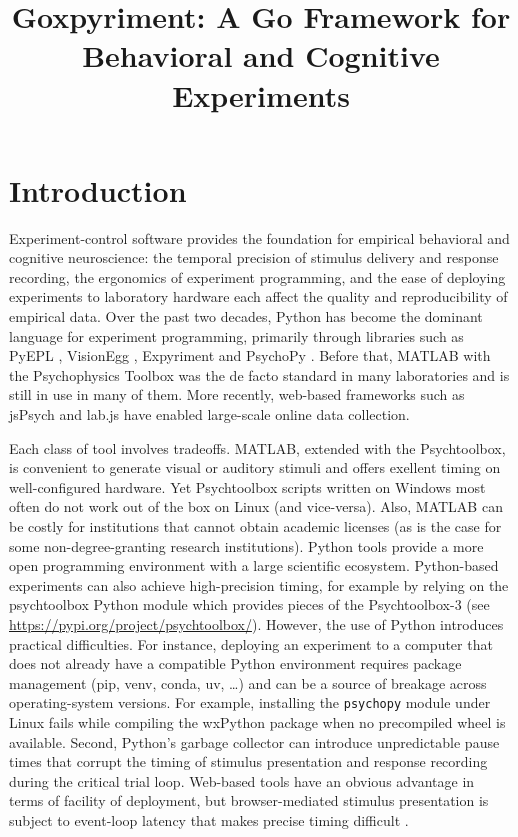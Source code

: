 \documentclass[doc,a4paper,floatsintext]{apa7}
\title{Goxpyriment: A Go Framework for Behavioral and Cognitive Experiments}
\begin{document}
\maketitle


\section{Introduction}\label{introduction}

Experiment-control software provides the foundation for empirical
behavioral and cognitive neuroscience: the temporal precision of
stimulus delivery and response recording, the ergonomics of experiment
programming, and the ease of deploying experiments to laboratory
hardware each affect the quality and reproducibility of empirical
data. Over the past two decades, Python has become the dominant
language for experiment programming, primarily through libraries such
as PyEPL \parencite{pyepl_2007}, VisionEgg \parencite{visionegg_2008},
Expyriment \parencite{krause2014} and PsychoPy
\parencite{peirce2019}. Before that, MATLAB with the Psychophysics
Toolbox \parencite{brainard1997, kleiner2007} was the de facto
standard in many laboratories and is still in use in many of
them. More recently, web-based frameworks such as jsPsych
\parencite{deleeuw2015, deleeuw2023} and lab.js
\parencite{henninger2022} have enabled large-scale online data
collection.

Each class of tool involves tradeoffs. MATLAB, extended with the
Psychtoolbox, is convenient to generate visual or auditory stimuli and
offers exellent timing on well-configured hardware. Yet Psychtoolbox
scripts written on Windows most often do not work out of the box on
Linux (and vice-versa). Also, MATLAB can be costly for institutions
that cannot obtain academic licenses (as is the case for some
non-degree-granting research institutions).  Python tools provide a
more open programming environment with a large scientific ecosystem.
Python-based experiments can also achieve high-precision timing, for
example by relying on the psychtoolbox Python module which provides
pieces of the Psychtoolbox-3 (see
\url{https://pypi.org/project/psychtoolbox/}). However, the use of
Python introduces practical difficulties. For instance, deploying an
experiment to a computer that does not already have a compatible
Python environment requires package management (pip, venv, conda, uv,
\ldots) and can be a source of breakage across operating-system
versions. For example, installing the \texttt{psychopy} module under
Linux fails while compiling the wxPython package when no precompiled
wheel is available. Second, Python's garbage collector can introduce
unpredictable pause times that corrupt the timing of
stimulus presentation and response recording during the critical trial
loop. Web-based tools have an obvious advantage in terms of facility
of deployment, but browser-mediated stimulus presentation is subject
to event-loop latency that makes precise timing difficult
\parencite{bridges2020, anwylirvine2021}.
\end{document}
